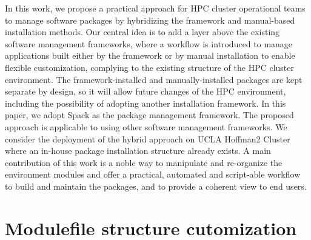\documentclass[conference]{IEEEtran}
\begin{document}
In this work, we propose a practical approach for HPC cluster operational teams to manage software packages by hybridizing the framework and manual-based installation methods. 
Our central idea is to add a layer above the existing software management frameworks, where a workflow is introduced to manage applications built either by the framework or by manual installation to enable flexible customization, complying to the existing structure of the HPC cluster environment.
The framework-installed and manually-installed packages are kept separate by design, so it will allow future changes of the HPC environment, including the possibility of adopting another installation framework.
In this paper, we adopt Spack as the package management framework. The proposed approach is applicable to using other software management frameworks. We consider the deployment of the hybrid approach on UCLA Hoffman2 Cluster where an in-house package installation structure already exists.
A main contribution of this work is a noble way to manipulate and re-organize the environment modules and offer a practical, automated and script-able workflow to build and maintain the packages, and to provide a coherent view to end users.



\section{Modulefile structure cutomization} \label{subsec_redefine_h2_modulefiles}

\end{document}
